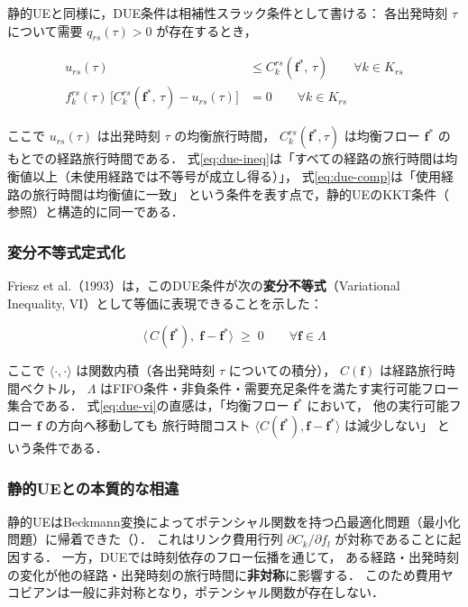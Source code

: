 静的UEと同様に，DUE条件は相補性スラック条件として書ける：
各出発時刻 $\tau$ について需要 $q_{rs}(\tau) > 0$ が存在するとき，

\begin{align}
  u_{rs}(\tau) &\leq C_k^{rs}(\boldsymbol{f}^*,\, \tau) \qquad \forall k \in K_{rs} \label{eq:due-ineq} \\
  f_k^{rs}(\tau)\,\bigl[C_k^{rs}(\boldsymbol{f}^*,\, \tau) - u_{rs}(\tau)\bigr] &= 0
  \qquad \forall k \in K_{rs} \label{eq:due-comp}
\end{align}

ここで $u_{rs}(\tau)$ は出発時刻 $\tau$ の均衡旅行時間，
$C_k^{rs}(\boldsymbol{f}^*, \tau)$ は均衡フロー $\boldsymbol{f}^*$ のもとでの経路旅行時間である．
式\eqref{eq:due-ineq}は「すべての経路の旅行時間は均衡値以上（未使用経路では不等号が成立し得る）」，
式\eqref{eq:due-comp}は「使用経路の旅行時間は均衡値に一致」
という条件を表す点で，静的UEのKKT条件（ 参照）と構造的に同一である．

\subsubsection*{変分不等式定式化}

Friesz et al.（1993）は，このDUE条件が次の\textbf{変分不等式}（Variational Inequality, VI）として等価に表現できることを示した\cite{Friesz1993}：

\begin{equation}
  \langle\, C(\boldsymbol{f}^*),\; \boldsymbol{f} - \boldsymbol{f}^* \rangle
  \;\geq\; 0
  \qquad \forall \boldsymbol{f} \in \Lambda
  \label{eq:due-vi}
\end{equation}

ここで $\langle \cdot, \cdot \rangle$ は関数内積（各出発時刻 $\tau$ についての積分），
$C(\boldsymbol{f})$ は経路旅行時間ベクトル，
$\Lambda$ はFIFO条件・非負条件・需要充足条件を満たす実行可能フロー集合である．
式\eqref{eq:due-vi}の直感は，「均衡フロー $\boldsymbol{f}^*$ において，
他の実行可能フロー $\boldsymbol{f}$ の方向へ移動しても
旅行時間コスト $\langle C(\boldsymbol{f}^*), \boldsymbol{f} - \boldsymbol{f}^* \rangle$ は減少しない」
という条件である．

\subsubsection*{静的UEとの本質的な相違}

静的UEはBeckmann変換によってポテンシャル関数を持つ凸最適化問題（最小化問題）に帰着できた（）．
これはリンク費用行列 $\partial C_k / \partial f_l$ が対称であることに起因する．
一方，DUEでは時刻依存のフロー伝播を通じて，
ある経路・出発時刻の変化が他の経路・出発時刻の旅行時間に\textbf{非対称}に影響する．
このため費用ヤコビアンは一般に非対称となり，ポテンシャル関数が存在しない．

